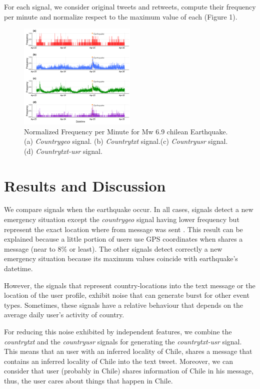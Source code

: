 \documentclass[letterpaper]{article} %
\begin{document}
For each signal, we consider original tweets and retweets, compute their frequency per minute and normalize respect to the maximum value of each (Figure 1).

\begin{figure}[h]
	
	\centering
	\includegraphics[width=0.5\textwidth]{img/freq_per_minute.png}
	\caption{Normalized Frequency per Minute for Mw 6.9 chilean Earthquake. (a) \textit{Countrygeo} signal. (b) \textit{Countrytxt} signal.(c) \textit{Countryusr} signal. (d) \textit{Countrytxt-usr} signal.}
\end{figure}

\section{Results and Discussion}

We compare signals when the earthquake occur. In all cases, signals detect a new emergency situation except the \textit{countrygeo} signal having lower frequency but represent the exact location where from message was sent . This result can be explained because a little portion of users use GPS coordinates when shares a message (near to $8\%$ or least). The other signals detect correctly a new emergency situation because its maximum values coincide with earthquake's datetime.

However, the signals that represent country-locations into the text message or the location of the user profile, exhibit noise that can generate burst for other event types. Sometimes, these signals have a relative behaviour that depends on the average daily user's activity of country. 

For reducing this noise exhibited by independent features, we combine the \textit{countrytxt} and the \textit{countryusr} signals for generating the \textit{countrytxt-usr} signal. This means that an user with an inferred locality of Chile, shares a message that contains an inferred locality of Chile into the text tweet. Moreover, we can consider that user (probably in Chile) shares information of Chile in his message, thus, the user cares about things that happen in Chile.
\end{document}

